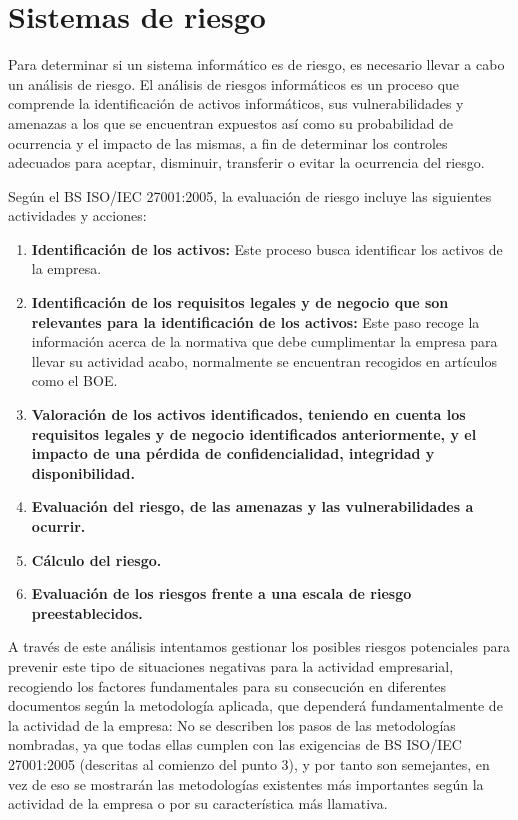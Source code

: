 \chapter{Sistemas de riesgo}
\label{cha:sistemas-de-riesgo}

Para determinar si un sistema informático es de riesgo, es necesario llevar a cabo un análisis de riesgo.
El análisis de riesgos informáticos es un proceso que comprende la identificación de activos informáticos, sus vulnerabilidades y amenazas a los que se encuentran expuestos así como su probabilidad de ocurrencia y el impacto de las mismas, a fin de determinar los controles adecuados para aceptar, disminuir, transferir o evitar la ocurrencia del riesgo.\cite{wikip} 

Según el BS ISO/IEC 27001:2005, la evaluación de riesgo incluye las siguientes actividades y acciones:
\begin{enumerate}
\item {\bfseries Identificación de los activos:}
Este proceso busca identificar los activos de la empresa.
\item {\bfseries Identificación de los requisitos legales y de negocio que son relevantes para la identificación de los activos:}
Este paso recoge la información acerca de la normativa que debe cumplimentar la empresa para llevar su actividad acabo, normalmente se encuentran recogidos en artículos como el BOE.
\item {\bfseries Valoración de los activos identificados, teniendo en cuenta los requisitos legales y de negocio identificados anteriormente, y el impacto de una pérdida de confidencialidad, integridad y disponibilidad.}
\item {\bfseries Evaluación del riesgo, de las amenazas y las vulnerabilidades a ocurrir.}
\item {\bfseries Cálculo del riesgo. }
\item {\bfseries Evaluación de los riesgos frente a una escala de riesgo preestablecidos.}
\end{enumerate}

A través de este análisis intentamos gestionar los posibles riesgos potenciales para prevenir este tipo de situaciones negativas para la actividad empresarial, recogiendo los factores fundamentales para su consecución en diferentes documentos según la metodología aplicada, que dependerá fundamentalmente de la actividad de la empresa:
No se describen los pasos de las metodologías nombradas, ya que todas ellas cumplen con las exigencias de BS ISO/IEC 27001:2005 (descritas al comienzo del punto 3), y por tanto son semejantes, en vez de eso se mostrarán las metodologías existentes más importantes según la actividad de la empresa o por su característica más llamativa.


